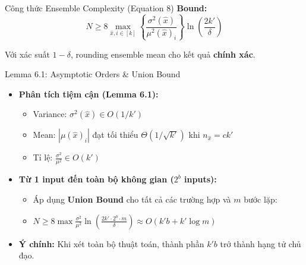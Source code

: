 \begin{frame}{Công thức Ensemble Complexity (Equation 8)}
  \textbf{Bound:}
  \[
    \boxed{N \ge 8 \max_{\hat{x}, i \in [k]} \left\{ \frac{\sigma^2(\hat{x})}{\mu^2(\hat{x})_i} \right\} \ln\left(\frac{2k'}{\delta}\right)}
  \]

  Với xác suất $1 - \delta$, rounding ensemble mean cho kết quả \textbf{chính xác}.
\end{frame}
\begin{frame}{Lemma 6.1: Asymptotic Orders \& Union Bound}
    \begin{itemize}
        \item \textbf{Phân tích tiệm cận (Lemma 6.1):} 
            \begin{itemize}
                \item Variance: $\sigma^2(\hat{x}) \in O(1/k')$ 
                \item Mean: $|\mu(\hat{x})_i|$ đạt tối thiểu $\Theta(1/\sqrt{k'})$ khi $n_{\hat{x}} = ck'$ 
                \item Tỉ lệ: $\frac{\sigma^2}{\mu^2} \in O(k')$ 
            \end{itemize}
        \item \textbf{Từ 1 input đến toàn bộ không gian ($2^b$ inputs):}
            \begin{itemize}
                \item Áp dụng \textbf{Union Bound} cho tất cả các trường hợp và $m$ bước lặp:
                \item $N \ge 8 \max \frac{\sigma^2}{\mu^2} \ln(\frac{2k' \cdot 2^b \cdot m}{\delta}) \approx O(k'b + k' \log m)$ 
            \end{itemize}
        \item \textbf{Ý chính:} Khi xét toàn bộ thuật toán, thành phần \textbf{$k'b$} trở thành hạng tử chủ đạo.
    \end{itemize}
\end{frame}

